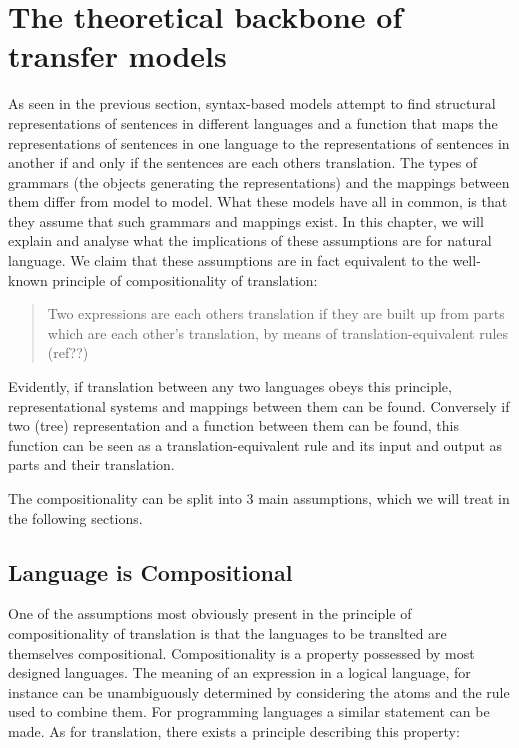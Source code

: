 \documentclass{report}
\theoremstyle{definition}
\theoremstyle{plain}
\begin{document}
\section{The theoretical backbone of transfer models}

As seen in the previous section, syntax-based models attempt to find structural representations of sentences in different languages and a function that maps the representations of sentences in one language to the representations of sentences in another if and only if the sentences are each others translation. The types of grammars (the objects generating the representations) and the mappings between them differ from model to model. What these models have all in common, is that they assume that such grammars and mappings exist. In this chapter, we will explain and analyse what the implications of these assumptions are for natural language. We claim that these assumptions are in fact equivalent to the well-known principle of compositionality of translation:

\begin{quote}
Two expressions are each others translation if they are built up from parts which are each other's translation, by means of translation-equivalent rules (ref??)
\end{quote}

Evidently, if translation between any two languages obeys this principle, representational systems and mappings between them can be found. Conversely if two (tree) representation and a function between them can be found, this function can be seen as a translation-equivalent rule and its input and output as parts and their translation.

The compositionality can be split into 3 main assumptions, which we will treat in the following sections.




\subsection{Language is Compositional}

One of the assumptions most obviously present in the principle of compositionality of translation is that the languages to be translted are themselves compositional. Compositionality is a property possessed by most designed languages. The meaning of an expression in a logical language, for instance can be unambiguously determined by considering the atoms and the rule used to combine them. For programming languages a similar statement can be made. As for translation, there exists a principle describing this property:
\end{document}
